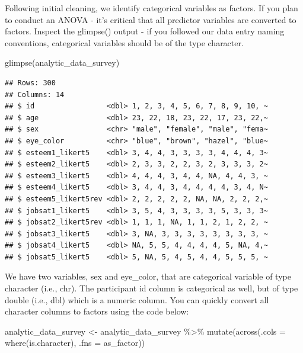 \documentclass[
]{krantz}
\makeatletter
\newenvironment{Shaded}{\begin{snugshade}}{\end{snugshade}}
\newcommand{\AttributeTok}[1]{\textcolor[rgb]{0.61,0.61,0.61}{#1}}
\newcommand{\FunctionTok}[1]{\textcolor[rgb]{0,0,0}{#1}}
\newcommand{\NormalTok}[1]{#1}
\newcommand{\OtherTok}[1]{\textcolor[rgb]{0.37,0.37,0.37}{#1}}
\newcommand{\SpecialCharTok}[1]{\textcolor[rgb]{0,0,0}{#1}}
\newenvironment{kframe}{%
\medskip{}
\setlength{\fboxsep}{.8em}
 \def\at@end@of@kframe{}%
 \ifinner\ifhmode%
  \def\at@end@of@kframe{\end{minipage}}%
  \begin{minipage}{\columnwidth}%
 \fi\fi%
 \def\FrameCommand##1{\hskip\@totalleftmargin \hskip-\fboxsep
 \colorbox{shadecolor}{##1}\hskip-\fboxsep
     \hskip-\linewidth \hskip-\@totalleftmargin \hskip\columnwidth}%
 \MakeFramed {\advance\hsize-\width
   \@totalleftmargin\z@ \linewidth\hsize
   \@setminipage}}%
 {\par\unskip\endMakeFramed%
 \at@end@of@kframe}
\renewenvironment{Shaded}{\begin{kframe}}{\end{kframe}}
\makeatother
\begin{document}
Following initial cleaning, we identify categorical variables as factors. If you plan to conduct an ANOVA - it's critical that all predictor variables are converted to factors. Inspect the glimpse() output - if you followed our data entry naming conventions, categorical variables should be of the type character.

\begin{Shaded}
\begin{Highlighting}[]
\FunctionTok{glimpse}\NormalTok{(analytic\_data\_survey)}
\end{Highlighting}
\end{Shaded}

\begin{verbatim}
## Rows: 300
## Columns: 14
## $ id                 <dbl> 1, 2, 3, 4, 5, 6, 7, 8, 9, 10, ~
## $ age                <dbl> 23, 22, 18, 23, 22, 17, 23, 22,~
## $ sex                <chr> "male", "female", "male", "fema~
## $ eye_color          <chr> "blue", "brown", "hazel", "blue~
## $ esteem1_likert5    <dbl> 3, 4, 4, 3, 3, 3, 3, 4, 4, 4, 3~
## $ esteem2_likert5    <dbl> 2, 3, 3, 2, 2, 3, 2, 3, 3, 3, 2~
## $ esteem3_likert5    <dbl> 4, 4, 4, 3, 4, 4, NA, 4, 4, 3, ~
## $ esteem4_likert5    <dbl> 3, 4, 4, 3, 4, 4, 4, 4, 3, 4, N~
## $ esteem5_likert5rev <dbl> 2, 2, 2, 2, 2, NA, NA, 2, 2, 2,~
## $ jobsat1_likert5    <dbl> 3, 5, 4, 3, 3, 3, 3, 5, 3, 3, 3~
## $ jobsat2_likert5rev <dbl> 1, 1, 1, NA, 1, 1, 2, 1, 2, 2, ~
## $ jobsat3_likert5    <dbl> 3, NA, 3, 3, 3, 3, 3, 3, 3, 3, ~
## $ jobsat4_likert5    <dbl> NA, 5, 5, 4, 4, 4, 4, 5, NA, 4,~
## $ jobsat5_likert5    <dbl> 5, NA, 5, 4, 5, 4, 4, 5, 5, 5, ~
\end{verbatim}

We have two variables, sex and eye\_color, that are categorical variable of type character (i.e., chr). The participant id column is categorical as well, but of type double (i.e., dbl) which is a numeric column. You can quickly convert all character columns to factors using the code below:

\begin{Shaded}
\begin{Highlighting}[]
\NormalTok{analytic\_data\_survey }\OtherTok{\textless{}{-}}\NormalTok{ analytic\_data\_survey }\SpecialCharTok{\%\textgreater{}\%}
  \FunctionTok{mutate}\NormalTok{(}\FunctionTok{across}\NormalTok{(}\AttributeTok{.cols =} \FunctionTok{where}\NormalTok{(is.character),}
                \AttributeTok{.fns =}\NormalTok{ as\_factor))}
\end{Highlighting}
\end{Shaded}
\end{document}
